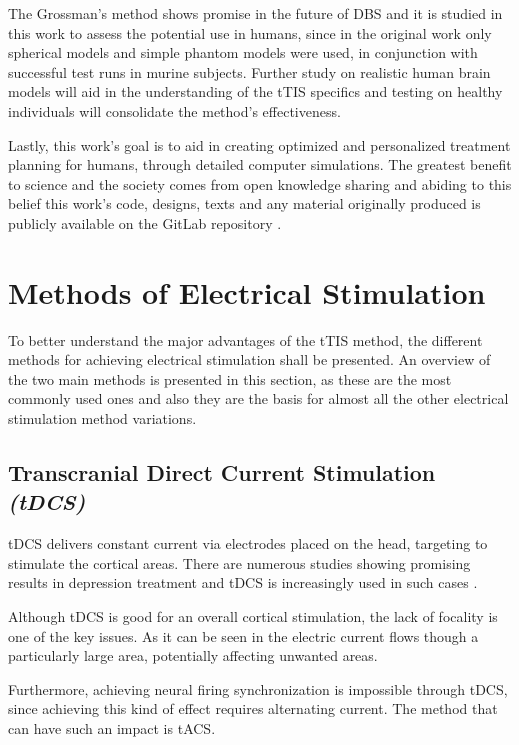 The Grossman's method shows promise in the future of \gls{DBS} and it is studied in this work to assess the potential use in humans, since in the original work \cite{Grossman2017} only spherical models and simple phantom models were used, in conjunction with successful test runs in murine subjects. Further study on realistic human brain models will aid in the understanding of the \gls{tTIS} specifics and testing on healthy individuals will consolidate the method's effectiveness.

Lastly, this work's goal is to aid in creating optimized and personalized treatment planning for humans, through detailed computer simulations. The greatest benefit to science and the society comes from open knowledge sharing and abiding to this belief this work's code, designs, texts and any material originally produced is publicly available on the GitLab repository \cite{thesis_repo}.

\section{Methods of Electrical Stimulation}

To better understand the major advantages of the \gls{tTIS} method, the different methods for achieving electrical stimulation shall be presented. An overview of the two main methods is presented in this section, as these are the most commonly used ones and also they are the basis for almost all the other electrical stimulation method variations.

\subsection{Transcranial Direct Current Stimulation \textit{(tDCS)}}

\gls{tDCS} delivers constant current via electrodes placed on the head, targeting to stimulate the cortical areas. There are numerous studies showing promising results in depression treatment \cite{Moffa2020,Brunoni2016} and \gls{tDCS} is increasingly used in such cases \cite{Nitsche2008}.

Although \gls{tDCS} is good for an overall cortical stimulation, the lack of focality is one of the key issues. As it can be seen in  the electric current flows though a particularly large area, potentially affecting unwanted areas.


Furthermore, achieving neural firing synchronization is impossible through \gls{tDCS}, since achieving this kind of effect requires alternating current. The method that can have such an impact is \gls{tACS}.

